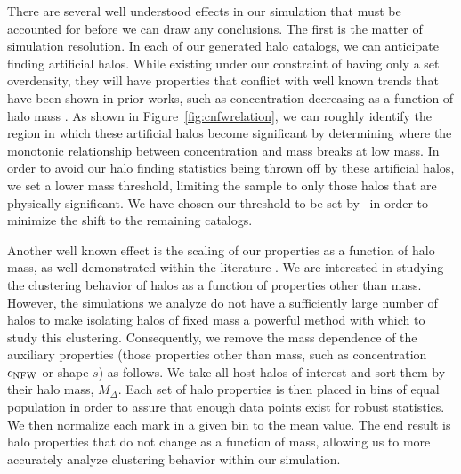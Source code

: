 \documentclass[usenatbib,usegraphicx,letterpaper]{mn2e}
\begin{document}
There are several well understood effects in our simulation that must be accounted for before we can draw any conclusions. The first is the matter of simulation resolution. In each of our generated halo catalogs, we can anticipate finding artificial halos. While existing under our constraint of having only a set overdensity, they will have properties that conflict with well known trends that have been shown in prior works, such as concentration decreasing as a function of halo mass \citep{wechsler06}. As shown in Figure~\ref{fig:cnfwrelation}, we can roughly identify the region in which these artificial halos become significant by determining where the monotonic relationship between concentration and mass breaks at low mass. In order to avoid our halo finding statistics being thrown off by these artificial halos, we set a lower mass threshold, limiting the sample to only those halos that are physically significant. We have chosen our threshold to be set by \simB \ in order to minimize the shift to the remaining catalogs.

Another well known effect is the scaling of our properties as a function of halo mass, as well demonstrated within the literature \citep{duffy08}. We are interested in studying the clustering behavior of halos as a function of properties other than mass. However, 
the simulations we analyze do not have a sufficiently large number of halos to make isolating halos of fixed mass a powerful method 
with which to study this clustering. Consequently, we remove the mass dependence of the auxiliary properties (those properties other than mass, such as concentration $c_{\rm NFW}$ or shape $s$) as follows. 
We take all host halos of interest and sort them by their halo mass, $M_{\Delta}$. 
Each set of halo properties is then placed in bins of equal population in order to assure 
that enough data points exist for robust statistics. We then normalize each mark in a 
given bin to the mean value. The end result is halo properties that do not 
change as a function of mass, allowing us to more accurately analyze clustering behavior within our simulation. 
\end{document}
